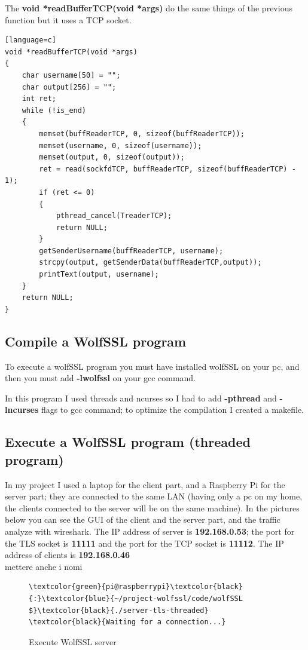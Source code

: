 \documentclass[a4paper,12pt]{article}
\begin{document}
The \textbf{void *readBufferTCP(void *args)} do the same things of the previous function but it uses a TCP socket.
\begin{lstlisting}[caption={void *readBufferTCP(void *args) of TLS client},captionpos=b][language=c]
void *readBufferTCP(void *args)
{
    char username[50] = "";
    char output[256] = "";
    int ret;
    while (!is_end)
    {
        memset(buffReaderTCP, 0, sizeof(buffReaderTCP));
        memset(username, 0, sizeof(username));
        memset(output, 0, sizeof(output));
        ret = read(sockfdTCP, buffReaderTCP, sizeof(buffReaderTCP) - 1);
        if (ret <= 0)
        {
            pthread_cancel(TreaderTCP);
            return NULL;
        }
        getSenderUsername(buffReaderTCP, username);
        strcpy(output, getSenderData(buffReaderTCP,output));
        printText(output, username);
    }
    return NULL;
}
\end{lstlisting}

\subsection{Compile a WolfSSL program}
To execute a wolfSSL program you must have installed wolfSSL on your pc, and then you must add \textbf{-lwolfssl} on your gcc command.

In this program I used threads and ncurses so I had to add \textbf{-pthread} and \textbf{-lncurses} flags to gcc command; to optimize the compilation I created a makefile.

\subsection{Execute a WolfSSL program (threaded program)}
In my project I used a laptop for the client part, and a Raspberry Pi for the server part; they are connected to the same LAN (having only a pc on my home, the clients connected to the server will be on the same machine).
In the pictures below you can see the GUI of the client and the server part, and the traffic analyze with wireshark.
The IP address of server is \textbf{192.168.0.53}; the port for the TLS socket is \textbf{11111} and the port for the TCP socket is \textbf{11112}.
The IP address of clients is \textbf{192.168.0.46}\\ mettere anche i nomi 

\begin{figure}[H]
\begin{Verbatim}[commandchars=\\\{\}]
\textcolor{green}{pi@raspberrypi}\textcolor{black}{:}\textcolor{blue}{~/project-wolfssl/code/wolfSSL $}\textcolor{black}{./server-tls-threaded}
\textcolor{black}{Waiting for a connection...}
\end{Verbatim}
\caption{Execute WolfSSL server}
\end{figure}
\end{document}
